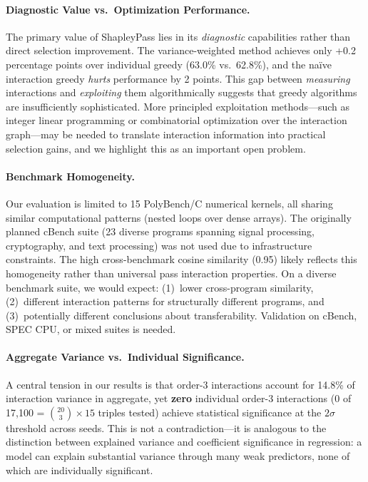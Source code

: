 \documentclass[preprint]{article}
\begin{document}
\paragraph{Diagnostic Value vs.\ Optimization Performance.}
The primary value of ShapleyPass lies in its \emph{diagnostic} capabilities rather than direct selection improvement. The variance-weighted method achieves only +0.2 percentage points over individual greedy (63.0\% vs.\ 62.8\%), and the na\"ive interaction greedy \emph{hurts} performance by 2 points. This gap between \emph{measuring} interactions and \emph{exploiting} them algorithmically suggests that greedy algorithms are insufficiently sophisticated. More principled exploitation methods---such as integer linear programming or combinatorial optimization over the interaction graph---may be needed to translate interaction information into practical selection gains, and we highlight this as an important open problem.

\paragraph{Benchmark Homogeneity.}
Our evaluation is limited to 15 PolyBench/C numerical kernels, all sharing similar computational patterns (nested loops over dense arrays). The originally planned cBench suite (23 diverse programs spanning signal processing, cryptography, and text processing) was not used due to infrastructure constraints. The high cross-benchmark cosine similarity (0.95) likely reflects this homogeneity rather than universal pass interaction properties. On a diverse benchmark suite, we would expect: (1)~lower cross-program similarity, (2)~different interaction patterns for structurally different programs, and (3)~potentially different conclusions about transferability. Validation on cBench, SPEC CPU, or mixed suites is needed.

\paragraph{Aggregate Variance vs.\ Individual Significance.}
A central tension in our results is that order-3 interactions account for 14.8\% of interaction variance in aggregate, yet \textbf{zero} individual order-3 interactions (0 of 17{,}100 = $\binom{20}{3} \times 15$ triples tested) achieve statistical significance at the $2\sigma$ threshold across seeds. This is not a contradiction---it is analogous to the distinction between explained variance and coefficient significance in regression: a model can explain substantial variance through many weak predictors, none of which are individually significant.
\end{document}
